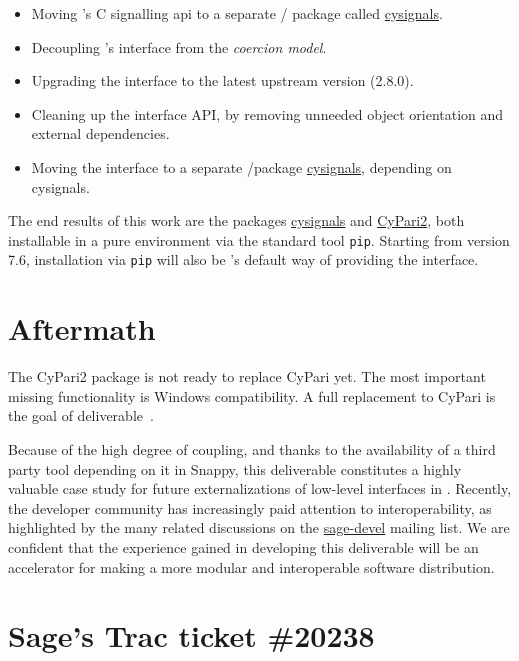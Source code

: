 \documentclass{deliverablereport}
\begin{document}
\begin{itemize}
\tightlist
\item Moving \Sage's C signalling api to a separate \Python/\Cython
  package called
  \href{https://github.com/sagemath/cysignals}{cysignals}.
\item Decoupling \Sage's \Pari interface from the \emph{coercion
    model}.
\item Upgrading the \Pari interface to the latest upstream version
  (2.8.0).
\item Cleaning up the \Pari interface API, by removing unneeded object
  orientation and external dependencies.
\item Moving the \Pari interface to a separate \Python/\Cython package
  \href{https://github.com/sagemath/cysignals}{cysignals}, depending
  on cysignals.
\end{itemize}

The end results of this work are the packages
\href{https://github.com/sagemath/cysignals}{cysignals} and
\href{https://github.com/sagemath/cypari2}{CyPari2}, both installable
in a pure \Python environment via the standard tool
\texttt{pip}. Starting from version 7.6, installation via \texttt{pip}
will also be \Sage's default way of providing the \Pari interface.


\section{Aftermath}

The CyPari2 package is not ready to replace CyPari yet. The most
important missing functionality is Windows compatibility. A full
replacement to CyPari is the goal of
deliverable~.

Because of the high degree of coupling, and thanks to the availability
of a third party tool depending on it in Snappy, this deliverable
constitutes a highly valuable case study for future externalizations
of low-level interfaces in \Sage. Recently, the \Sage developer
community has increasingly paid attention to interoperability, as
highlighted by the many related discussions on the
\href{https://groups.google.com/forum/#!forum/sage-devel}{sage-devel}
mailing list.  We are confident that the experience gained in
developing this deliverable will be an accelerator for making \Sage a
more modular and interoperable software distribution.

\clearpage
\appendix
\section{Sage's Trac ticket \#20238}
\end{document}
